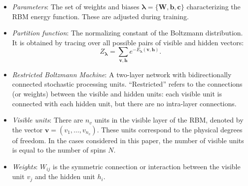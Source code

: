 \documentclass[submission, Phys, hidelnks]{SciPost}
\begin{document}
\begin{itemize}
\item \textit{Parameters}: The set of weights and biases $\bm{\lambda} = \{\bm{W},\bm{b},\bm{c}\}$ characterizing the RBM energy function. These are adjusted during training.

\item \textit{Partition function}: The normalizing constant of the Boltzmann
distribution. It is obtained by tracing over all possible pairs of visible and
hidden vectors:
\begin{equation}
   Z_{\bm{\lambda}} = \sum\limits_{\bm{v},\bm{h}}e^{-E_{\bm{\lambda}}(\bm{v},\bm{h})}.
\end{equation}

\item \textit{Restricted Boltzmann Machine}: A two-layer network with
bidirectionally connected stochastic processing units. ``Restricted'' refers to
the connections (or weights) between the visible and hidden units: each visible
unit is connected with each hidden unit, but there are no intra-layer connections.

\item \textit{Visible units}: There are $n_v$ units in the visible layer of the
RBM, denoted by the vector $\bm{v}=(v_1,\dots,v_{n_v})$. These units correspond
to the physical degrees of freedom. In the cases considered in this paper, the
number of visible units is equal to the number of spins $N$.

\item \textit{Weights}: $W_{ij}$ is the symmetric connection or interaction
between the visible unit $v_j$ and the hidden unit $h_i$.

\end{itemize}


\nolinenumbers{}
\end{document}
